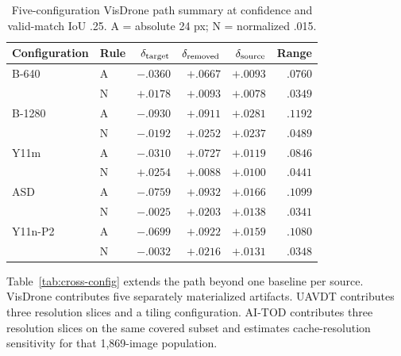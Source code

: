 \documentclass[journal]{IEEEtran}
\begin{document}
\begin{table}[!t]
\centering
\caption{Five-configuration VisDrone path summary at confidence and valid-match IoU .25. A = absolute 24 px; N = normalized .015.}\label{tab:ledger}
\tiny
\setlength{\tabcolsep}{2.0pt}\renewcommand{\arraystretch}{.98}
\begin{tabular}{llrrrr}
\toprule
Configuration & Rule & $\delta_{\rm target}$ & $\delta_{\rm removed}$ & $\delta_{\rm source}$ & Range\\
\midrule
B-640 & A & $-.0360$ & $+.0667$ & $+.0093$ & $.0760$\\
      & N & $+.0178$ & $+.0093$ & $+.0078$ & $.0349$\\
B-1280 & A & $-.0930$ & $+.0911$ & $+.0281$ & $.1192$\\
       & N & $-.0192$ & $+.0252$ & $+.0237$ & $.0489$\\
Y11m & A & $-.0310$ & $+.0727$ & $+.0119$ & $.0846$\\
     & N & $+.0254$ & $+.0088$ & $+.0100$ & $.0441$\\
ASD & A & $-.0759$ & $+.0932$ & $+.0166$ & $.1099$\\
    & N & $-.0025$ & $+.0203$ & $+.0138$ & $.0341$\\
Y11n-P2 & A & $-.0699$ & $+.0922$ & $+.0159$ & $.1080$\\
        & N & $-.0032$ & $+.0216$ & $+.0131$ & $.0348$\\
\bottomrule
\end{tabular}
\end{table}

Table~\ref{tab:cross-config} extends the path beyond one baseline per source. VisDrone contributes five separately materialized artifacts. UAVDT contributes three resolution slices and a tiling configuration. AI-TOD contributes three resolution slices on the same covered subset and estimates cache-resolution sensitivity for that 1,869-image population.
\end{document}

